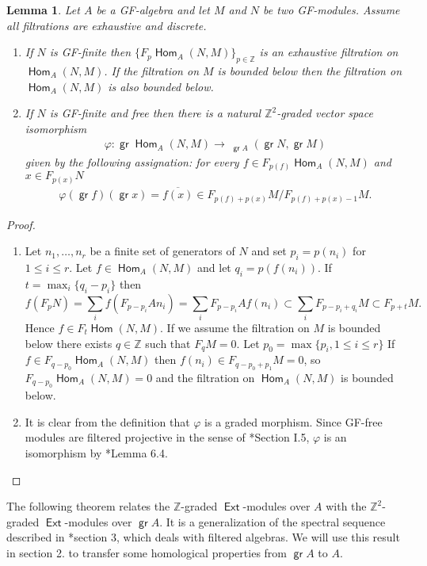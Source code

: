 \documentclass[11pt,fleqn]{article}
\theoremstyle{plain}
\newtheorem{Lemma}[Theorem]{Lemma}
\theoremstyle{remark}
\theoremstyle{definition}
\newcommand\ZZ{\mathbb Z}
\renewcommand\to{\longrightarrow}
\renewcommand\phi{\varphi}
\DeclareMathOperator\Hom{\mathsf{Hom}}
\DeclareMathOperator\Ext{\mathsf{Ext}}
\DeclareMathOperator\GrHom{\underline{\mathsf{Hom}}}
\DeclareMathOperator\gr{\mathsf{gr}}
\begin{document}
\begin{Lemma}
\label{filtered-hom}
Let $A$ be a GF-algebra and let $M$ and $N$ be two GF-modules. Assume all
filtrations are exhaustive and discrete. 
\begin{enumerate}
	\item If $N$ is GF-finite then $\{F_p\Hom_A(N,M)\}_{p \in \ZZ}$ is an exhaustive
	filtration on $\Hom_A(N,M)$. If the filtration on $M$ is bounded below then the
	filtration on $\Hom_A(N,M)$ is also bounded below.

	\item If $N$ is GF-finite and free then there is a natural $\ZZ^2$-graded
	vector space isomorphism
	\begin{align*}
		\phi: \gr \Hom_A(N,M) \to  \GrHom_{\gr A}(\gr N, \gr M)
	\end{align*}
	given by the following assignation: for every $f \in F_{p(f)}\Hom_A(N,M)$
	and $x \in F_{p(x)}N$
	\begin{align*}
		\phi(\gr f)(\gr x) = \overline{f(x)} \in F_{p(f) + p(x)}M /
		F_{p(f)+p(x)-1} M.
	\end{align*}
\end{enumerate}
\end{Lemma}
\begin{proof}
\begin{enumerate}
	\item Let $n_1, \ldots, n_r$ be a finite set of generators of $N$ and set $p_i =
	p(n_i)$ for $1 \leq i \leq r$. Let $f \in \Hom_A(N,M)$ and let $q_i = p(f(n_i))$. 
	If $t =	\max_i\{q_i - p_i\}$ then
	\[
		f(F_pN) = \sum_i f(F_{p - p_i}A n_i) = \sum_i F_{p -p_i}A
		f(n_i) \subset \sum_i F_{p - p_i + q_i}M \subset F_{p +
		t}M.
	\]
	Hence $f \in F_t\Hom(N,M)$. If we assume the filtration on $M$ is bounded below
	there exists $q \in \ZZ$ such that $F_q M = 0$. Let $p_0 = \max\{p_i, 1 \leq i
	\leq r\}$ If $f \in F_{q - p_0}\Hom_A(N,M)$ then $f(n_i) \in F_{q - p_0 + p_1}M =
	0$, so $F_{q-p_0}\Hom_A(N,M) = 0$ and the filtration on $\Hom_A(N,M)$ is bounded
	below.

	\item It is clear from the definition that $\phi$ is a graded morphism. Since 
	GF-free modules are filtered projective in the sense of \cite{VO}*{Section I.5},
	$\phi$ is an isomorphism by \cite{VO}*{Lemma 6.4}.
\end{enumerate}
\end{proof}

The following theorem relates the $\ZZ$-graded $\Ext$-modules over $A$ with the
$\ZZ^2$-graded $\Ext$-modules over $\gr A$. It is a generalization of the spectral
sequence described in \cite{B}*{section 3}, which deals with filtered algebras. We will
use this result in section 2. to transfer some homological properties from $\gr A$ to $A$.
\end{document}
